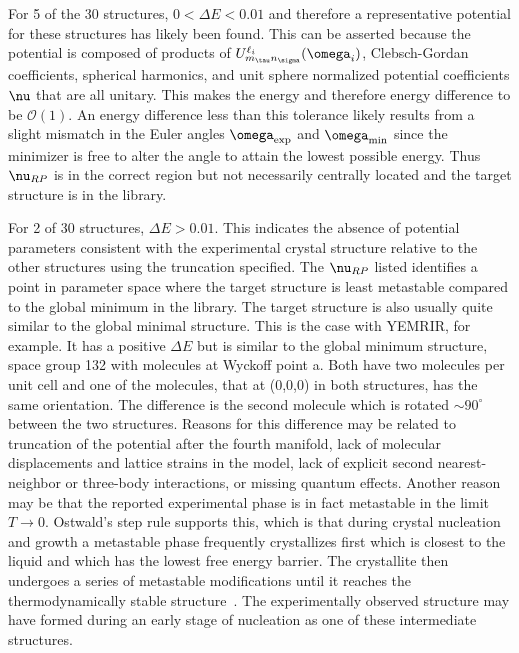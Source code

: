 \documentclass[preprint]{iucr}              %
\newcommand{\mb}[1]{\ensuremath{\mbox{\boldmath $ #1 $}}}
\begin{document}
For 5 of the 30 structures, $0< \Delta E < 0.01$ and therefore a
representative potential for these structures has likely been found.
This can be asserted because the potential is composed of products
of $U^{\ell_i}_{m_\tau n_\sigma}(\mb{\omega}_i)$, Clebsch-Gordan
coefficients, spherical harmonics, and unit sphere normalized
potential coefficients $\mb{\nu}$ that are all unitary.  This makes
the energy and therefore energy difference to be $\mathcal{O}(1)$.
An energy difference less than this tolerance likely results from a
slight mismatch in the Euler angles $\mb{\omega}_{\mathrm{exp}}$ and
$\mb{\omega}_{\mathrm{min}}$ since the minimizer is free to alter
the angle to attain the lowest possible energy.  Thus
$\mb{\nu}_{RP}$ is in the correct region but not necessarily
centrally located and the target structure is in the library.

For 2 of 30 structures, $\Delta E > 0.01$.  This indicates the
absence of potential parameters consistent with the experimental
crystal structure relative to the other structures using the
truncation specified.  The $\mb{\nu}_{RP}$ listed identifies a point
in parameter space where the target structure is least metastable
compared to the global minimum in the library.  The target structure
is also usually quite similar to the global minimal structure. This
is the case with YEMRIR, for example. It has a positive $\Delta E$
but is similar to the global minimum structure, space group 132 with
molecules at Wyckoff point a. Both have two molecules per unit cell
and one of the molecules, that at (0,0,0) in both structures, has
the same orientation.  The difference is the second molecule which
is rotated $\sim 90^\circ$ between the two structures. Reasons for
this difference may be related to truncation of the potential after
the fourth manifold, lack of molecular displacements and lattice
strains in the model, lack of explicit second nearest-neighbor or
three-body interactions, or missing quantum effects.  Another reason
may be that the reported experimental phase is in fact metastable in
the limit $T\rightarrow 0$. Ostwald's step rule supports this, which
is that during crystal nucleation and growth a metastable phase
frequently crystallizes first which is closest to the liquid and
which has the lowest free energy barrier. The crystallite then
undergoes a series of metastable modifications until it reaches the
thermodynamically stable structure~\cite{Schmalzried03}. The
experimentally observed structure may have formed during an early
stage of nucleation as one of these intermediate structures.
\end{document}
